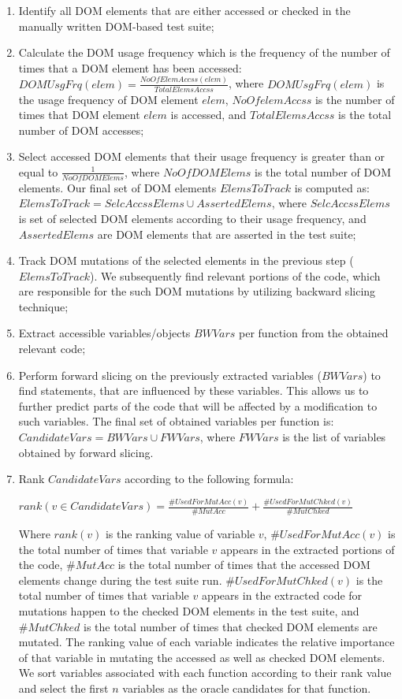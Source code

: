 \begin{enumerate}
\item Identify all DOM elements
that are either accessed or checked in the manually written DOM-based test suite; 
\item Calculate the DOM usage frequency which is the frequency of the number of times that a DOM element has been accessed:
$DOMUsgFrq(elem)=\frac{NoOfElemAccss(elem)}{TotalElemsAccss}$, where $DOMUsgFrq(elem)$ is the usage frequency of DOM element $elem$, $NoOfelemAccss$ is the number of times that DOM element $elem$ is accessed, and $TotalElemsAccss$ is the total number of DOM accesses;
\item Select accessed DOM elements that their usage frequency is greater than or equal to $\frac{1}{NoOfDOMElems}$, where $NoOfDOMElems$ is the total number of DOM elements. Our final set of DOM elements $ElemsToTrack$ is computed as:
$ElemsToTrack=SelcAccssElems\cup AssertedElems$, where $SelcAccssElems$ is set of selected DOM elements according to their usage frequency, and $AssertedElems$ are DOM elements that are asserted in the test suite;    
\item Track DOM mutations of the selected elements in the previous step ($ElemsToTrack$). We subsequently find relevant portions of the code, which are responsible for the such DOM mutations by utilizing backward slicing technique; 
\item Extract accessible variables/objects $BWVars$ per function from the obtained relevant code;
\item Perform forward slicing on the previously extracted variables ($BWVars$) to find statements, that are influenced by these variables. This allows us to further predict parts of the code that will be affected by a modification to such variables. The final set of obtained variables per function is: $CandidateVars=BWVars\cup FWVars$, where $FWVars$ is the list of variables obtained by forward slicing.  
\item Rank $CandidateVars$ according to the following formula:

$rank(v\in CandidateVars)=\frac{\# UsedForMutAcc(v)}{\# MutAcc} + \frac{\# UsedForMutChked(v)}{\# MutChked}$

Where $rank(v)$ is the ranking value of variable $v$, $\# UsedForMutAcc(v)$ is the total number of
times that variable $v$ appears in the extracted portions of the code, $\# MutAcc$ is the total number of times that the
accessed DOM elements change during the test suite run. $\# UsedForMutChked(v)$ is the total
number of times that variable $v$ appears in the extracted code for mutations happen to the checked
DOM elements in the test suite, and $\# MutChked$ is the total number of times that checked DOM
elements are mutated. The ranking value of each variable indicates the relative importance of
that variable in mutating the accessed as well as checked DOM elements. We sort variables
associated with each function according to their rank value and select the first $n$ variables as the
oracle candidates for that function.
\end{enumerate}

